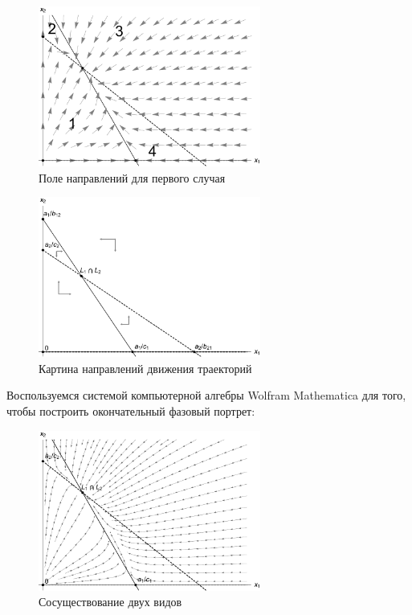 \documentclass[12pt,a4paper]{article}
\begin{document}
    
    \begin{figure}[h]
        \centering
        \includegraphics[width=0.65\textwidth]{areas_1.pdf}
        \caption{Поле направлений для первого случая}
        \label{fig:areas_1}
    \end{figure}

    \begin{figure}[h]
        \centering
        \includegraphics[width=0.65\textwidth]{areas_1*.pdf}
        \caption{Картина направлений движения траекторий}
        \label{fig:areas_1*}
    \end{figure}

    \pagebreak

    Воспользуемся системой компьютерной алгебры Wolfram Mathematica для того, чтобы построить окончательный фазовый портрет:
    \begin{figure}[h]
        \centering
        \includegraphics[width=0.65\textwidth]{phase_1.pdf}
        \caption{Сосуществование двух видов}
        \label{fig:phase_1}
    \end{figure}
\end{document}
